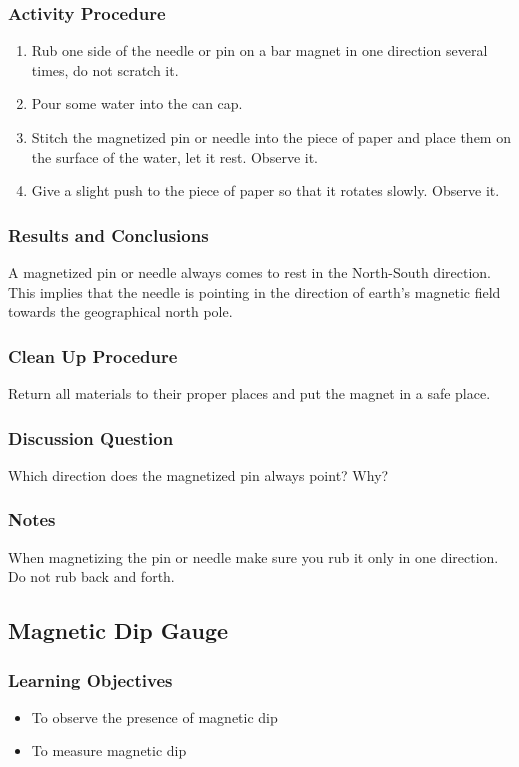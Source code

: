 \subsubsection*{Activity Procedure}
\begin{enumerate}
\item{Rub one side of the needle or pin on a bar magnet in one direction several times, do not scratch it.} 
\item{Pour some water into the can cap.} 
\item{Stitch the magnetized pin or needle into the piece of paper and place them on the surface of the water, let it rest. Observe it.} 
\item{Give a slight push to the piece of paper so that it rotates slowly. Observe it.} 
\end{enumerate}

\subsubsection*{Results and Conclusions}
A magnetized pin or needle always comes to rest in the North-South direction.  This implies that the needle is pointing in the direction of earth's magnetic field towards the geographical north pole.

\subsubsection*{Clean Up Procedure}
Return all materials to their proper places and put the magnet in a safe place.

\subsubsection*{Discussion Question}
Which direction does the magnetized pin always point? Why?

\subsubsection*{Notes}
When magnetizing the pin or needle make sure you rub it only in one direction. Do not rub back and forth.

\subsection{Magnetic Dip Gauge}

\subsubsection*{Learning Objectives}
\begin{itemize}
\item{To observe the presence of magnetic dip}
\item{To measure magnetic dip}
\end{itemize}

